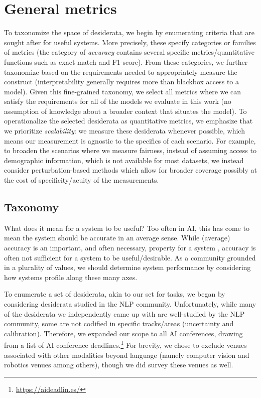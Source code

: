 \hypertarget{metrics}{\section{General metrics}}
\label{sec:metrics}
To taxonomize the space of desiderata, we begin by enumerating criteria that are sought after for useful systems.
More precisely, these specify categories or families of metrics (\eg the category of \textit{accuracy} contains several specific metrics/quantitative functions such as exact match and F1-score). 
From these categories, we further taxonomize based on the requirements needed to appropriately measure the construct (\eg interpretability generally requires more than blackbox access to a model).
Given this fine-grained taxonomy, we select all metrics where we can satisfy the requirements for all of the models we evaluate in this work (\eg no assumption of knowledge about a broader context that situates the model). 
To operationalize the selected desiderata as quantitative metrics, we emphasize that we prioritize \textit{scalability}: we measure these desiderata whenever possible, which means our measurement is agnostic to the specifics of each scenario.
For example, to broaden the scenarios where we measure fairness, instead of assuming access to demographic information, which is not available for most datasets, we instead consider perturbation-based methods which allow for broader coverage possibly at the cost of specificity/acuity of the measurements.

\hypertarget{metric-taxonomy}{\subsection{Taxonomy}}
\label{sec:metrics-taxonomy}
What does it mean for a system to be useful?
Too often in AI, this has come to mean the system should be accurate in an average sense.
While (average) accuracy is an important, and often necessary, property for a system \citep{raji2022fallacy}, accuracy is often not sufficient for a system to be useful/desirable.
As a community grounded in a plurality of values, we should determine system performance by considering how systems profile along these many axes.

To enumerate a set of desiderata, akin to our set for tasks, we began by considering desiderata studied in the NLP community.
Unfortunately, while many of the desiderata we independently came up with are well-studied by the NLP community, some are not codified in specific tracks/areas (\eg uncertainty and calibration). 
Therefore, we expanded our scope to all AI conferences, drawing from a list of AI conference deadlines.\footnote{\url{https://aideadlin.es/}}
For brevity, we chose to exclude venues associated with other modalities beyond language (namely computer vision and robotics venues among others), though we did survey these venues as well.


